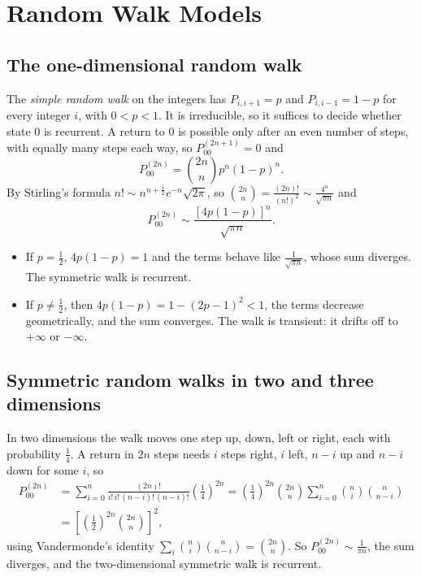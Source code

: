 \documentclass[12pt,a4paper]{report}
\theoremstyle{definition}
\begin{document}
\section{Random Walk Models}

\subsection{The one-dimensional random walk}

The \emph{simple random walk} on the integers has $P_{i,i + 1} = p$ and $P_{i,i - 1} = 1 - p$
for every integer $i$, with $0<p<1$. It is irreducible, so it suffices to decide whether
state $0$ is recurrent. A return to $0$ is possible only after an even number of steps, with
equally many steps each way, so $P_{00}^{(2n + 1)} = 0$ and
\[P_{00}^{(2n)} = \binom{2n}{n}p^n(1 - p)^n .\]
By Stirling's formula $n!\sim n^{n + \frac12}e^{-n}\sqrt{2\pi}$, so
$\binom{2n}{n} = \frac{(2n)!}{(n!)^2}\sim\frac{4^n}{\sqrt{\pi n}}$ and
\[P_{00}^{(2n)}\sim\frac{\left[4p(1 - p)\right]^n}{\sqrt{\pi n}} .\]
\begin{itemize}
\item If $p = \frac12$, $4p(1 - p) = 1$ and the terms behave like $\frac{1}{\sqrt{\pi n}}$, whose sum
diverges. The symmetric walk is recurrent.
\item If $p\ne\frac12$, then $4p(1 - p) = 1 - (2p - 1)^2<1$, the terms decrease geometrically, and
the sum converges. The walk is transient: it drifts off to $+\infty$ or $-\infty$.
\end{itemize}

\subsection{Symmetric random walks in two and three dimensions}

In two dimensions the walk moves one step up, down, left or right, each with probability
$\frac14$. A return in $2n$ steps needs $i$ steps right, $i$ left, $n - i$ up and $n - i$ down for
some $i$, so
\begin{align*}
P_{00}^{(2n)} &= \sum_{i=0}^n\frac{(2n)!}{i!\,i!\,(n - i)!\,(n - i)!}\left(\frac14\right)^{2n}
= \left(\frac14\right)^{2n}\binom{2n}{n}\sum_{i=0}^n\binom ni\binom{n}{n - i}\\
&= \left[\left(\frac12\right)^{2n}\binom{2n}{n}\right]^2,
\end{align*}
using Vandermonde's identity $\sum_i\binom ni\binom{n}{n - i} = \binom{2n}{n}$. So
$P_{00}^{(2n)}\sim\frac{1}{\pi n}$, the sum diverges, and the two-dimensional symmetric walk is
recurrent.
\end{document}
